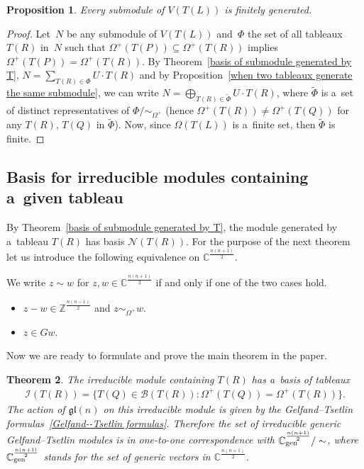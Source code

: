 \documentclass[pdftex]{sigma}
\numberwithin{equation}{section}
\newtheorem{Theorem}{Theorem}[section]
\newtheorem{Proposition}[Theorem]{Proposition}
{ \theoremstyle{definition}
\newtheorem{Definition}[Theorem]{Definition}
\newtheorem{Note}[Theorem]{Note}
\newtheorem{Example}[Theorem]{Example}
\newtheorem{Notation}[Theorem]{Notation}
\newtheorem{Remark}[Theorem]{Remark} }
\begin{document}
\begin{Proposition}
Every submodule of $V(T(L))$ is finitely generated.
\end{Proposition}
\begin{proof}
Let~$N$ be any submodule of $V(T(L))$ and~$\Phi$ the set of all tableaux $T(R)$ in~$N$ such that
$\Omega^{+}(T(P))\subseteq\Omega^{+}(T(R))$ implies $\Omega^{+}(T(P))=\Omega^{+}(T(R))$.
By Theorem~\ref{basis of submodule generated by T}, $N=\sum\limits_{T(R)\in\Phi} U\cdot T(R)$ and by
Proposition~\ref{when two tableaux generate the same submodule}, we can write $N=\bigoplus_{T(R)\in\tilde{\Phi}} U\cdot
T(R)$, where $\tilde{\Phi}$ is a~set of distinct representatives of $\Phi/\sim_{\Omega^+}$ (hence
$\Omega^{+}(T(R))\neq\Omega^{+}(T(Q))$ for any $T(R)$, $T(Q)$ in $\tilde{\Phi}$).
Now, since $\Omega(T(L))$ is a~f\/inite set, then $\tilde{\Phi}$ is f\/inite.
\end{proof}

\subsection{Basis for irreducible modules containing a~given tableau}
By Theorem~\ref{basis of submodule generated by T}, the module generated by a~tableau $T(R)$ has basis
$\mathcal{N}(T(R))$.
For the purpose of the next theorem let us introduce the following equivalence on ${\mathbb C}^{\frac{n(n+1)}{2}}$.

\begin{Definition}
We write $z\sim w$ for $z,w \in {\mathbb C}^{\frac{n(n+1)}{2}}$ if and only if one of the two cases hold.
\begin{itemize}\itemsep=0pt
\item[(i)] $z-w \in {\mathbb Z}^{\frac{n(n-1)}{2}}$ and $z \sim_{\Omega^+} w$.
\item[(ii)] $z \in G w$.
\end{itemize}
\end{Definition}

Now we are ready to formulate and prove the main theorem in the paper.

\begin{Theorem}
\label{characterization of irreducible basis}
The irreducible module containing $T(R)$ has a~basis of tableaux
\begin{gather*}
\mathcal{I}(T(R))=\big\{T(Q)\in\mathcal{B}(T(R)): \Omega^{+}(T(Q))=\Omega^{+}(T(R))\big\}.
\end{gather*}
The action of $\mathfrak{gl}(n)$ on this irreducible module is given by the Gelfand--Tsetlin
formulas~\eqref{Gelfand--Tsetlin formulas}.
Therefore the set of irreducible generic Gelfand--Tsetlin modules is in one-to-one correspondence with $ {\mathbb
C}^{\frac{n(n+1)}{2}}_{\rm gen}/ \sim$, where ${\mathbb C}^{\frac{n(n+1)}{2}}_{\rm gen}$ stands for the set of generic
vectors in ${\mathbb C}^{\frac{n(n+1)}{2}}$.
\end{Theorem}
\end{document}
